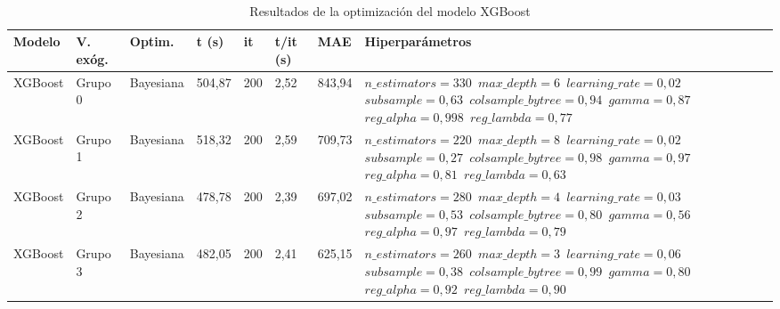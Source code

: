 \documentclass[12pt,a4paper]{report}
\begin{document}
\begin{table}[H]
\centering
\caption{\\ Resultados de la optimización del modelo XGBoost}
\scriptsize
\begin{tabular}{m{1cm} m{1.2cm} m{1.2cm} m{1cm} m{1cm} m{1.2cm} m{1.2cm} m{3.5cm}} 
\toprule
\textbf{Modelo} & \textbf{V. exóg.} & \textbf{Optim.} & \textbf{t (s)} & \textbf{it} & \textbf{t/it (s)} & \textbf{MAE} & \textbf{Hiperparámetros} \\
\midrule
XGBoost   & Grupo 0 & Bayesiana & 504,87 & 200 & 2,52 & 843,94 & \texttt{$n\_estimators=330$ \newline $max\_depth=6$ \newline $learning\_rate=0,02$ \newline $subsample=0,63$ \newline $colsample\_bytree=0,94$ \newline $gamma=0,87$ \newline $reg\_alpha=0,998$ \newline $reg\_lambda=0,77$} \\[0.5em]
\hline
XGBoost   & Grupo 1 & Bayesiana & 518,32 & 200 & 2,59 & 709,73 & \texttt{$n\_estimators=220$ \newline $max\_depth=8$ \newline $learning\_rate=0,02$ \newline $subsample=0,27$ \newline $colsample\_bytree=0,98$ \newline $gamma=0,97$ \newline $reg\_alpha=0,81$ \newline $reg\_lambda=0,63$} \\[0.5em]
\hline
XGBoost   & Grupo 2 & Bayesiana & 478,78 & 200 & 2,39 & 697,02 & \texttt{$n\_estimators=280$ \newline $max\_depth=4$ \newline $learning\_rate=0,03$ \newline $subsample=0,53$ \newline $colsample\_bytree=0,80$ \newline $gamma=0,56$ \newline $reg\_alpha=0,97$ \newline $reg\_lambda=0,79$} \\[0.5em]
\hline
XGBoost   & Grupo 3 & Bayesiana & 482,05 & 200 & 2,41 & 625,15 & \texttt{$n\_estimators=260$ \newline $max\_depth=3$ \newline $learning\_rate=0,06$ \newline $subsample=0,38$ \newline $colsample\_bytree=0,99$ \newline $gamma=0,80$ \newline $reg\_alpha=0,92$ \newline $reg\_lambda=0,90$} \\[0.5em]

\end{tabular}
\end{table}
\end{document}
